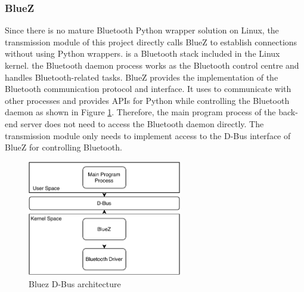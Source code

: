 \subsubsection{BlueZ}
Since there is no mature Bluetooth Python wrapper solution on Linux, the transmission module of this project directly calls BlueZ to establish connections without using Python wrappers. \textcite{bluez} is a Bluetooth stack included in the Linux kernel. the Bluetooth daemon process works as the Bluetooth control centre and handles Bluetooth-related tasks. BlueZ provides the implementation of the Bluetooth communication protocol and interface. It uses \textcite{dbus} to communicate with other processes and provides APIs for Python while controlling the Bluetooth daemon as shown in Figure \ref{fig:bluez}. Therefore, the main program process of the back-end server does not need to access the Bluetooth daemon directly. The transmission module only needs to implement access to the D-Bus interface of BlueZ for controlling Bluetooth.
\begin{figure}[H]
    \centering
    \includegraphics[width=0.6\textwidth]{figure/bluez.pdf}
    \caption{Bluez D-Bus architecture}
    \label{fig:bluez}
\end{figure}


